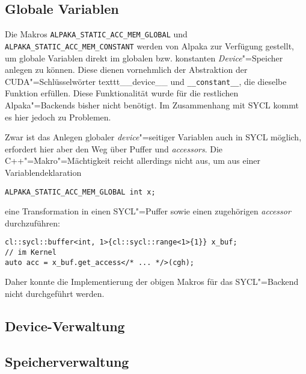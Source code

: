 \subsection{Globale Variablen}\label{implementierung:probleme:globalvar}

Die Makros \texttt{ALPAKA\_STATIC\_ACC\_MEM\_GLOBAL} und
\texttt{ALPAKA\_STATIC\_ACC\_MEM\_CONSTANT} werden von Alpaka zur Verfügung
gestellt, um globale Variablen direkt im globalen bzw. konstanten
\textit{Device}"=Speicher anlegen zu können. Diese dienen vornehmlich der
Abstraktion der CUDA"=Schlüsselwörter texttt{\_\_device\_\_} und
\texttt{\_\_constant\_\_}, die dieselbe Funktion erfüllen. Diese Funktionalität
wurde für die restlichen Alpaka"=Backends bisher nicht benötigt. Im Zusammenhang
mit SYCL kommt es hier jedoch zu Problemen.

Zwar ist das Anlegen globaler \textit{device}"=seitiger Variablen auch in SYCL
möglich, erfordert hier aber den Weg über Puffer und \textit{accessors}. Die
C++"=Makro"=Mächtigkeit reicht allerdings nicht aus, um aus einer
Variablendeklaration

\begin{code}
    \begin{verbatim}
ALPAKA_STATIC_ACC_MEM_GLOBAL int x;
    \end{verbatim}
\end{code}

eine Transformation in einen SYCL"=Puffer sowie einen zugehörigen
\textit{accessor} durchzuführen:

\begin{code}
    \begin{verbatim}
cl::sycl::buffer<int, 1>{cl::sycl::range<1>{1}} x_buf;
// im Kernel
auto acc = x_buf.get_access</* ... */>(cgh);
    \end{verbatim}
\end{code}

Daher konnte die Implementierung der obigen Makros für das SYCL"=Backend nicht
durchgeführt werden.

\subsection{Device-Verwaltung}\label{implementierung:probleme:device}

\subsection{Speicherverwaltung}\label{implementierung:probleme:speicher}


